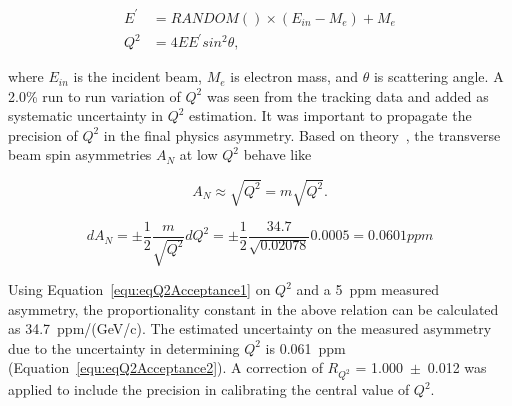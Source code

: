 \begin{equation} \label{equ:eqQ2Calculation}
\begin{split}
E^{\prime} &= RANDOM()\times(E_{in} - M_{e}) + M_{e} \\
Q^{2} &= 4EE^{\prime}sin^{2}\theta,
\end{split}
\end{equation}

\noindent 
where $E_{in}$ is the incident beam, $M_{e}$ is electron mass, and $\theta$ is scattering angle. 
A 2.0\% run to run variation of $Q^{2}$ was seen from the tracking data and added as systematic uncertainty in $Q^{2}$ estimation. It was important to propagate the precision of $Q^{2}$ in the final physics asymmetry. Based on theory~\cite{Afanasev200448}, the transverse beam spin asymmetries $A_{N}$ at low $Q^{2}$ behave like

\begin{equation} \label{equ:eqQ2Acceptance1}
A_{N} \approx \sqrt{Q^{2}} = m\sqrt{Q^{2}}.
\end{equation}

\begin{equation} \label{equ:eqQ2Acceptance2}
dA_{N} = \pm \frac{1}{2} \frac{m}{\sqrt{Q^{2}}} dQ^{2}
= \pm \frac{1}{2} \frac{34.7}{\sqrt{0.02078}} 0.0005
=  0.0601 ppm
\end{equation}

Using Equation~\ref{equ:eqQ2Acceptance1} on $Q^{2}$ and a 5~ppm measured asymmetry, the proportionality constant in the above relation can be calculated as 34.7~ppm/(GeV/c). The estimated uncertainty on the measured asymmetry due to the uncertainty in determining $Q^{2}$ is 0.061~ppm (Equation~\ref{equ:eqQ2Acceptance2}). 
A correction of $R_{Q^{2}}$ = 1.000~$\pm$~0.012 was applied to include the precision in calibrating the central value of $Q^{2}$.





